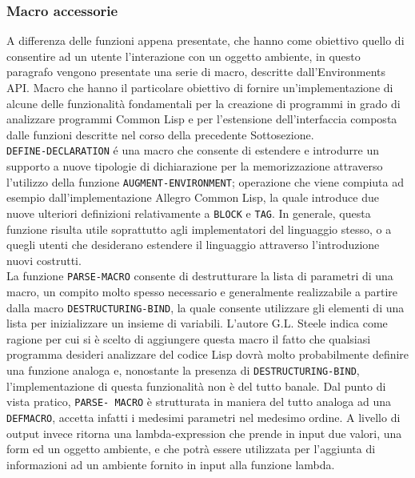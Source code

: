 \subsubsection{Macro accessorie}

A differenza delle funzioni appena presentate, che hanno come obiettivo quello
di consentire ad un utente l'interazione con un oggetto ambiente, in questo
paragrafo vengono presentate una serie di macro, descritte dall'Environments
API. Macro che hanno il particolare obiettivo di fornire un'implementazione di
alcune delle funzionalità fondamentali per la creazione di programmi in grado di
analizzare programmi Common Lisp e per l'estensione dell'interfaccia composta
dalle funzioni descritte nel corso della precedente Sottosezione.\\

\texttt{DEFINE-DECLARATION} é una macro che consente di estendere e introdurre
un supporto a nuove tipologie di dichiarazione per la memorizzazione attraverso
l'utilizzo della funzione \texttt{AUGMENT-ENVIRONMENT}; operazione che viene
compiuta ad esempio dall’implementazione Allegro Common Lisp, la quale introduce
due nuove ulteriori definizioni relativamente a \texttt{BLOCK} e \texttt{TAG}.
In generale, questa funzione risulta utile soprattutto agli implementatori del
linguaggio stesso, o a quegli utenti che desiderano estendere il linguaggio
attraverso l'introduzione nuovi costrutti.\\

La funzione \texttt{PARSE-MACRO} consente di destrutturare la lista di parametri
di una macro, un compito molto spesso necessario e generalmente realizzabile a
partire dalla macro \texttt{DESTRUCTURING-BIND}, la quale consente utilizzare
gli elementi di una lista per inizializzare un insieme di variabili. L’autore
G.L. Steele indica come ragione per cui si è scelto di aggiungere questa macro
il fatto che qualsiasi programma desideri analizzare del codice Lisp dovrà molto
probabilmente definire una funzione analoga e, nonostante la presenza di \texttt
{DESTRUCTURING-BIND}, l’implementazione di questa funzionalità non è del tutto
banale. \cite{steele1990common} Dal punto di vista pratico, \texttt {PARSE-
MACRO} è strutturata in maniera del tutto analoga ad una \texttt{DEFMACRO},
accetta infatti i medesimi parametri nel medesimo ordine. A livello di output
invece ritorna una lambda-expression che prende in input due valori, una form ed
un oggetto ambiente, e che potrà essere utilizzata per l'aggiunta di
informazioni ad un ambiente fornito in input alla funzione lambda.\\

